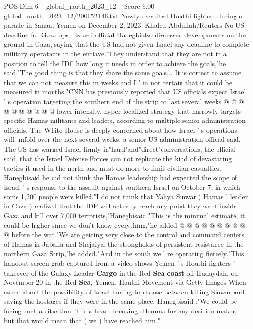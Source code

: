 \begin{textsample}{POS Dim 6 – global\_north\_2023\_12 – Score 9.00 – global\_north\_2023\_12/200052146.txt}
Newly recruited Houthi fighters during a parade in Sanaa, Yemen on December 2, 2023.
Khaled Abdullah/Reuters No US deadline for Gaza ops : Israeli official Hanegbialso discussed developments on the ground in Gaza, saying that the US had not given Israel any deadline to complete military operations in the enclave."They understand that they are not in a position to tell the IDF how long it needs in order to achieve the goals,"he said."The good thing is that they share the same goals...
It is correct to assume that we can not measure this in weeks and I ' m not certain that it could be measured in months."CNN has previously reported that US officials expect Israel ' s operation targeting the southern end of the strip to last several weeks @ @ @ @ @ @ @ @ @ @ lower-intensity, hyper-localized strategy that narrowly targets specific Hamas militants and leaders, according to multiple senior administration officials.
The White House is deeply concerned about how Israel ' s operations will unfold over the next several weeks, a senior US administration official said.
The US has warned Israel firmly in"hard"and"direct"conversations, the official said, that the Israel Defense Forces can not replicate the kind of devastating tactics it used in the north and must do more to limit civilian casualties.
Hanegbisaid he did not think the Hamas leadership had expected the scope of Israel ' s response to the assault against southern Israel on October 7, in which some 1,200 people were killed."I do not think that Yahya Sinwar ( Hamas ' leader in Gaza ) realized that the IDF will actually reach any point they want inside Gaza and kill over 7,000 terrorists,"Hanegbisaid."This is the minimal estimate, it could be higher since we don't know everything,"he added @ @ @ @ @ @ @ @ @ @ before the war."We are getting very close to the control and command centers of Hamas in Jabalia and Shejaiya, the strongholds of persistent resistance in the northern Gaza Strip,"he added."And in the south we ' re operating fiercely."This handout screen grab captured from a video shows Yemen ' s Houthi fighters ' takeover of the Galaxy Leader \textbf{Cargo} in the Red \textbf{Sea} \textbf{coast} off Hudaydah, on November 20 in the Red \textbf{Sea}, Yemen.
Houthi Movement via Getty Images When asked about the possibility of Israel having to choose between killing Sinwar and saving the hostages if they were in the same place, Hanegbisaid :"We could be facing such a situation, it is a heart-breaking dilemma for any decision maker, but that would mean that ( we ) have reached him."

\end{textsample}
